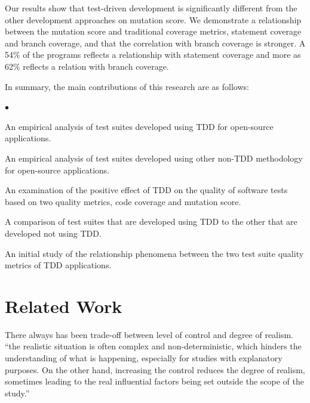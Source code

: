 \documentclass[conference]{IEEEtran}
\newcommand{\squishlist}{
 \begin{list}{$\bullet$}
  { \setlength{\itemsep}{0pt}
     \setlength{\parsep}{3pt}
     \setlength{\topsep}{3pt}
     \setlength{\partopsep}{0pt}
     \setlength{\leftmargin}{1.5em}
     \setlength{\labelwidth}{1em}
     \setlength{\labelsep}{0.5em} } }
\newcommand{\squishend}{
  \end{list}  }
\begin{document}
Our results show that test-driven development is significantly different from the other development approaches on mutation score. We demonstrate a relationship between the mutation score and traditional coverage metrics, statement coverage and branch coverage, and that the correlation with branch coverage is stronger. A 54\% of the programs reflects a relationship with statement coverage and more as %
62\% reflects a relation with branch coverage. %

In summary, the main contributions of this research are as follows:
\squishlist  
\item An empirical analysis of test suites developed using TDD for open-source applications.
\item An empirical analysis of test suites developed using other non-TDD methodology for open-source applications.
\item An examination of the positive effect of TDD on the quality of software tests based on two quality metrics, code coverage and mutation score.
\item A comparison of test suites that are developed using TDD to the other that are developed not using TDD.
\item An initial study of the relationship phenomena between the two test suite quality metrics of TDD applications.
\squishend

\section{Related Work} \label{sec:relatedWork}

There always has been trade-off between level of control and degree of realism. ``the realistic situation is often complex and non-deterministic, which hinders the understanding of what is happening, especially for studies with explanatory purposes. On the other hand, increasing the control reduces the degree of realism, sometimes leading to the real influential factors being set outside the scope of the study.''\cite{runeson2009guidelines} %
 
\end{document}
